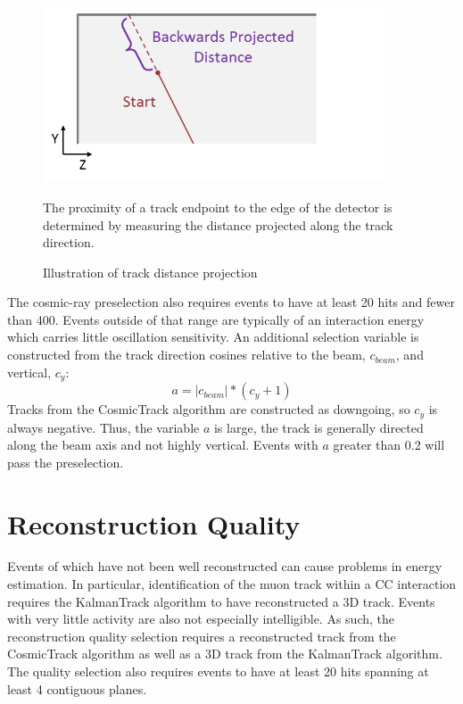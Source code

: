 \begin{figure}[t]
\begin{center}
\includegraphics[width=0.9\textwidth]{figures/selection/backdist.png}
\end{center}
\caption{Illustration of track distance projection}{
The proximity of a track endpoint to the edge of the detector is determined
by measuring the distance projected along the track direction.
}
\label{trackproj}
\end{figure}

The cosmic-ray preselection also requires events to have at least 20 hits
and fewer than 400.  Events outside of that range are typically of an
interaction energy which carries little oscillation sensitivity.  An additional
selection variable is constructed from the track direction cosines relative to
the beam, $c_{beam}$, and vertical, $c_y$:
\begin{equation}
a = |c_{beam}| * (c_y + 1)
\end{equation}
Tracks from the CosmicTrack algorithm are constructed as downgoing, so $c_y$ is
always negative.  Thus, the variable $a$ is large, the track is generally
directed along the beam axis and not highly vertical.
Events with $a$ greater than 0.2 will pass the preselection.

\section{Reconstruction Quality}

Events of which have not been well reconstructed can cause problems
in energy estimation.
In particular, identification of the muon track within a \numu CC interaction requires the KalmanTrack algorithm to have reconstructed a 3D track.
Events with very little activity are also not especially intelligible.
As such, the reconstruction quality selection requires a reconstructed track
from the CosmicTrack algorithm as well as a 3D track from the KalmanTrack
algorithm.
The quality selection also requires events to have at least 20 hits
spanning at least 4 contiguous planes.

